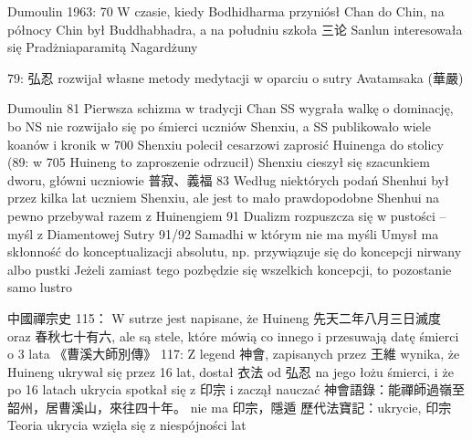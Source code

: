 Dumoulin 1963: 70
W czasie, kiedy Bodhidharma przyniósł Chan do Chin, na północy Chin był Buddhabhadra, a na południu szkoła 三论
Sanlun interesowała się Pradżniaparamitą Nagardżuny

79: 弘忍 rozwijał własne metody medytacji w oparciu o sutry Avatamsaka (華嚴)

Dumoulin 81
Pierwsza schizma w tradycji Chan
SS wygrała walkę o dominację, bo NS nie rozwijało się po śmierci uczniów Shenxiu, a SS publikowało wiele koanów i kronik
w 700 Shenxiu polecił cesarzowi zaprosić Huinenga do stolicy
(89: w 705 Huineng to zaproszenie odrzucił)
Shenxiu cieszył się szacunkiem dworu, główni uczniowie 普寂、義福
83
Według niektórych podań Shenhui był przez kilka lat uczniem Shenxiu, ale jest to mało prawdopodobne
Shenhui na pewno przebywał razem z Huinengiem
91 Dualizm rozpuszcza się w pustości -- myśl z Diamentowej Sutry
91/92 Samadhi w którym nie ma myśli
Umysł ma skłonność do konceptualizacji absolutu, np. przywiązuje się do koncepcji nirwany albo pustki
Jeżeli zamiast tego pozbędzie się wszelkich koncepcji, to pozostanie samo lustro


中國禪宗史 115：
W sutrze jest napisane, że Huineng 先天二年八月三日滅度 oraz 春秋七十有六, ale są stele, które mówią co innego i przesuwają datę śmierci o 3 lata
《曹溪大師別傳》
117: Z legend 神會, zapisanych przez 王維 wynika, że Huineng ukrywał się przez 16 lat, dostał 衣法 od 弘忍 na jego łożu śmierci, i że po 16 latach ukrycia spotkał się z 印宗 i zaczął nauczać
神會語錄：能禪師過嶺至韶州，居曹溪山，來往四十年。 nie ma 印宗，隱遁
歷代法寶記：ukrycie, 印宗
Teoria ukrycia wzięła się z niespójności lat
\fi
